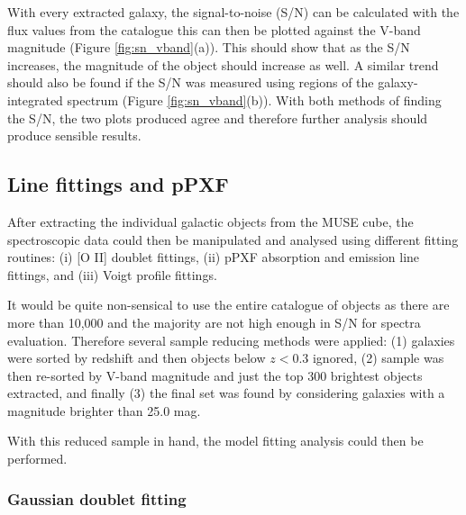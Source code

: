 \documentclass[12pt, twocolumn]{revtex4}    %
\begin{document}

With every extracted galaxy, the signal-to-noise (S/N) can be calculated with the flux values from the catalogue this can then be plotted against the V-band magnitude (Figure \ref{fig:sn_vband}(a)). This should show that as the S/N increases, the magnitude of the object should increase as well. A similar trend should also be found if the S/N was measured using regions of the galaxy-integrated spectrum (Figure \ref{fig:sn_vband}(b)). With both methods of finding the S/N, the two plots produced agree and therefore further analysis should produce sensible results. 

\subsection{Line fittings and pPXF} 

After extracting the individual galactic objects from the MUSE cube, the spectroscopic data could then be manipulated and analysed using different fitting routines: (i) [O II] doublet fittings, (ii) pPXF absorption and emission line fittings, and (iii) Voigt profile fittings.  

It would be quite non-sensical to use the entire catalogue of objects as there are more than 10,000 and the majority are not high enough in S/N for spectra evaluation. Therefore several sample reducing methods were applied: (1) galaxies were sorted by redshift and then objects below $z<0.3$ ignored, (2) sample was then re-sorted by V-band magnitude and just the top 300 brightest objects extracted, and finally (3) the final set was found by considering galaxies with a magnitude brighter than 25.0 mag. 

With this reduced sample in hand, the model fitting analysis could then be performed.





\subsubsection{Gaussian doublet fitting}
\end{document}
